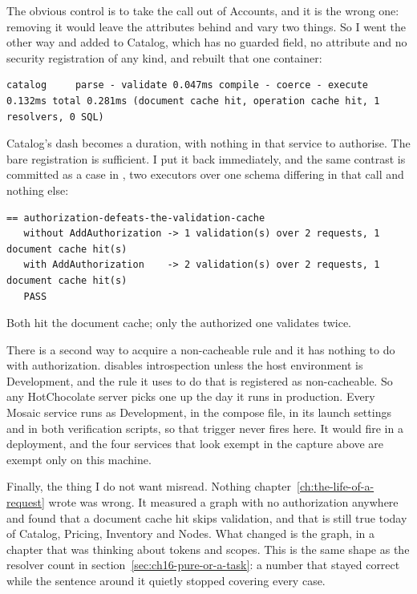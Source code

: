 The obvious control is to take the call out of Accounts, and it is the wrong
one: removing it would leave the \code{[Authorize]} attributes behind and vary
two things. So I went the other way and added
 to Catalog, which has no guarded field, no
attribute and no security registration of any kind, and rebuilt that one
container:

\begin{verbatim}
catalog     parse - validate 0.047ms compile - coerce - execute 0.132ms total 0.281ms (document cache hit, operation cache hit, 1 resolvers, 0 SQL)
\end{verbatim}

Catalog's dash becomes a duration, with nothing in that service to authorise.
The bare registration is sufficient. I put it back immediately, and the same
contrast is committed as a case in , two
executors over one schema differing in that call and nothing else:

\begin{verbatim}
== authorization-defeats-the-validation-cache
   without AddAuthorization -> 1 validation(s) over 2 requests, 1 document cache hit(s)
   with AddAuthorization    -> 2 validation(s) over 2 requests, 1 document cache hit(s)
   PASS
\end{verbatim}

Both hit the document cache; only the authorized one validates twice.

%
There is a second way to acquire a non-cacheable rule and it has nothing to do
with authorization.  disables introspection unless the
host environment is Development, and the rule it uses to do that is registered
as non-cacheable. So any HotChocolate server picks one up the day it runs in
production. Every Mosaic service runs as Development, in the compose file, in
its launch settings and in both verification scripts, so that trigger never
fires here. It would fire in a deployment, and the four services that look
exempt in the capture above are exempt only on this machine.

%
Finally, the thing I do not want misread. Nothing
chapter~\ref{ch:the-life-of-a-request} wrote was wrong. It measured a graph with
no authorization anywhere and found that a document cache hit skips validation,
and that is still true today of Catalog, Pricing, Inventory and Nodes. What
changed is the graph, in a chapter that was thinking about tokens and scopes.
This is the same shape as the resolver count in
section~\ref{sec:ch16-pure-or-a-task}: a number that stayed correct while the
sentence around it quietly stopped covering every case.

